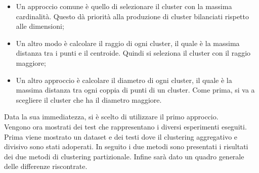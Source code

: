 \documentclass{llncs}
\newcommand{\acapo}{\vspace{0.5\baselineskip}\\}
\begin{document}
	\begin{itemize}
		\item Un approccio comune è quello di selezionare il cluster con la massima cardinalità. Questo dà priorità alla produzione di cluster bilanciati rispetto alle dimensioni;
	
		\item Un altro modo è calcolare il raggio di ogni cluster, il quale è la massima distanza tra i punti e il centroide. Quindi si seleziona il cluster con il raggio maggiore;
			
		\item Un altro approccio è calcolare il diametro di ogni cluster, il quale è la massima distanza tra ogni coppia di punti di un cluster.
			Come prima, si va a scegliere il cluster che ha il diametro maggiore.
	\end{itemize}
	Data la sua immediatezza, si è scelto di utilizzare il primo approccio.
	\acapo
	Vengono ora mostrati dei test che rappresentano i diversi esperimenti eseguiti. Prima viene mostrato un dataset e dei testi dove il clustering 
	aggregativo e divisivo sono stati adoperati. In seguito i due metodi sono presentati i risultati dei due metodi di clustering partizionale. Infine sarà dato un quadro
	generale delle differenze riscontrate.
	
	\clearpage
\end{document}
